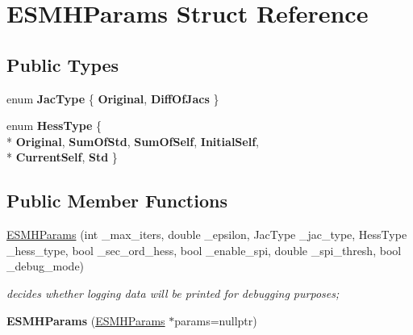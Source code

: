\hypertarget{structESMHParams}{\section{E\-S\-M\-H\-Params Struct Reference}
\label{structESMHParams}
}
\subsection*{Public Types}
\begin{DoxyCompactItemize}
\item 
enum {\bfseries Jac\-Type} \{ {\bfseries Original}, 
{\bfseries Diff\-Of\-Jacs}
 \}
\item 
enum {\bfseries Hess\-Type} \{ \\*
{\bfseries Original}, 
{\bfseries Sum\-Of\-Std}, 
{\bfseries Sum\-Of\-Self}, 
{\bfseries Initial\-Self}, 
\\*
{\bfseries Current\-Self}, 
{\bfseries Std}
 \}
\end{DoxyCompactItemize}
\subsection*{Public Member Functions}
\begin{DoxyCompactItemize}
\item 
\hyperlink{structESMHParams_a2146f0179851fd0958568f85261a4db2}{E\-S\-M\-H\-Params} (int \-\_\-max\-\_\-iters, double \-\_\-epsilon, Jac\-Type \-\_\-jac\-\_\-type, Hess\-Type \-\_\-hess\-\_\-type, bool \-\_\-sec\-\_\-ord\-\_\-hess, bool \-\_\-enable\-\_\-spi, double \-\_\-spi\-\_\-thresh, bool \-\_\-debug\-\_\-mode)
\begin{DoxyCompactList}\small\item\em decides whether logging data will be printed for debugging purposes; \end{DoxyCompactList}\item 
\hypertarget{structESMHParams_afd14946b9af7647cdb5308ed749271ab}{{\bfseries E\-S\-M\-H\-Params} (\hyperlink{structESMHParams}{E\-S\-M\-H\-Params} $\ast$params=nullptr)}\label{structESMHParams_afd14946b9af7647cdb5308ed749271ab}

\end{DoxyCompactItemize}
